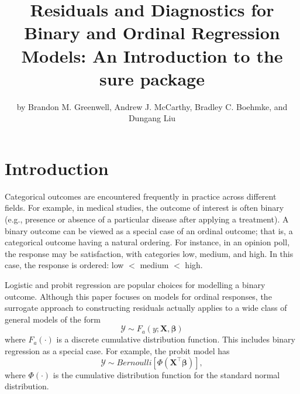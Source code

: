\title{Residuals and Diagnostics for Binary and Ordinal Regression Models: An Introduction to the sure package}
\author{by Brandon M. Greenwell, Andrew J. McCarthy, Bradley C. Boehmke, and Dungang Liu}

\maketitle



\section{Introduction}

Categorical outcomes are encountered frequently in practice across different fields. For example, in medical studies, the outcome of interest is often binary (e.g., presence or absence of a particular disease after applying a treatment). A binary outcome can be viewed as a special case of an ordinal outcome; that is, a categorical outcome having a natural ordering. For instance, in an opinion poll, the response may be satisfaction, with categories low, medium, and high. In this case, the response is ordered: low $<$ medium $<$ high.

Logistic and probit regression are popular choices for modelling a binary outcome. Although this paper focuses on models for ordinal responses, the surrogate approach to constructing residuals actually applies to a wide class of general models of the form
\begin{equation*}
  \mathcal{Y} \sim F_a\left(y; \boldsymbol{X}, \boldsymbol{\beta}\right)
\end{equation*}
where $F_a\left(\cdot\right)$ is a discrete cumulative distribution function. This includes binary regression as a special case. For example, the probit model has
\begin{equation*}
  \mathcal{Y} \sim Bernoulli\left[\Phi\left(\boldsymbol{X}^\top\boldsymbol{\beta}\right)\right],
\end{equation*}
where $\Phi\left(\cdot\right)$ is the cumulative distribution function for the standard normal distribution.


